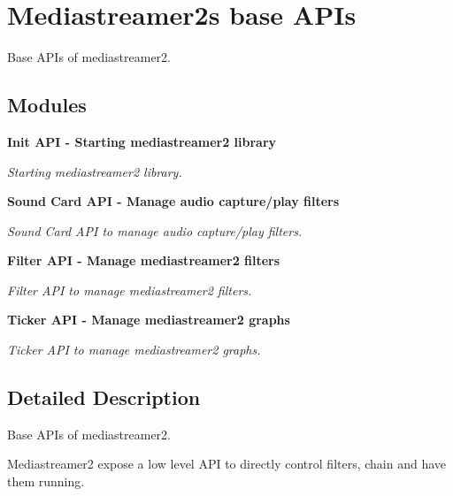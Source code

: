 \section{Mediastreamer2\textquotesingle{}s base A\+P\+Is}
\label{group__mediastreamer2__api}


Base A\+P\+Is of mediastreamer2.  


\subsection*{Modules}
\begin{DoxyCompactItemize}
\item 
\textbf{ Init A\+P\+I -\/ Starting mediastreamer2 library}
\begin{DoxyCompactList}\small\item\em Starting mediastreamer2 library. \end{DoxyCompactList}\item 
\textbf{ Sound Card A\+P\+I -\/ Manage audio capture/play filters}
\begin{DoxyCompactList}\small\item\em Sound Card A\+PI to manage audio capture/play filters. \end{DoxyCompactList}\item 
\textbf{ Filter A\+P\+I -\/ Manage mediastreamer2 filters}
\begin{DoxyCompactList}\small\item\em Filter A\+PI to manage mediastreamer2 filters. \end{DoxyCompactList}\item 
\textbf{ Ticker A\+P\+I -\/ Manage mediastreamer2 graphs}
\begin{DoxyCompactList}\small\item\em Ticker A\+PI to manage mediastreamer2 graphs. \end{DoxyCompactList}\end{DoxyCompactItemize}


\subsection{Detailed Description}
Base A\+P\+Is of mediastreamer2. 

Mediastreamer2 expose a low level A\+PI to directly control filters, chain and have them running. 